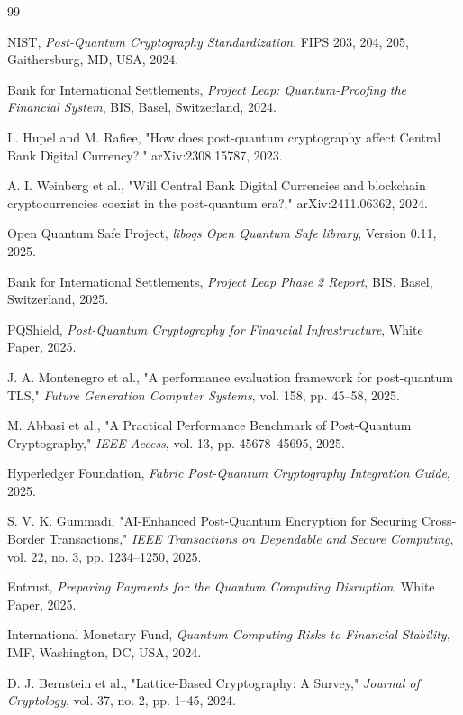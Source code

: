 \documentclass[pdflatex,sn-basic,english]{sn-jnl}
\begin{document}
\begin{thebibliography}{99}

NIST, \emph{Post-Quantum Cryptography Standardization}, FIPS 203, 204, 205, Gaithersburg, MD, USA, 2024.

Bank for International Settlements, \emph{Project Leap: Quantum-Proofing the Financial System}, BIS, Basel, Switzerland, 2024.

L. Hupel and M. Rafiee, "How does post-quantum cryptography affect Central Bank Digital Currency?," arXiv:2308.15787, 2023.

A. I. Weinberg et al., "Will Central Bank Digital Currencies and blockchain cryptocurrencies coexist in the post-quantum era?," arXiv:2411.06362, 2024.

Open Quantum Safe Project, \emph{liboqs Open Quantum Safe library}, Version 0.11, 2025.

Bank for International Settlements, \emph{Project Leap Phase 2 Report}, BIS, Basel, Switzerland, 2025.

PQShield, \emph{Post-Quantum Cryptography for Financial Infrastructure}, White Paper, 2025.

J. A. Montenegro et al., "A performance evaluation framework for post-quantum TLS," \emph{Future Generation Computer Systems}, vol. 158, pp. 45--58, 2025.

M. Abbasi et al., "A Practical Performance Benchmark of Post-Quantum Cryptography," \emph{IEEE Access}, vol. 13, pp. 45678--45695, 2025.

Hyperledger Foundation, \emph{Fabric Post-Quantum Cryptography Integration Guide}, 2025.

S. V. K. Gummadi, "AI-Enhanced Post-Quantum Encryption for Securing Cross-Border Transactions," \emph{IEEE Transactions on Dependable and Secure Computing}, vol. 22, no. 3, pp. 1234--1250, 2025.

Entrust, \emph{Preparing Payments for the Quantum Computing Disruption}, White Paper, 2025.

International Monetary Fund, \emph{Quantum Computing Risks to Financial Stability}, IMF, Washington, DC, USA, 2024.

D. J. Bernstein et al., "Lattice-Based Cryptography: A Survey," \emph{Journal of Cryptology}, vol. 37, no. 2, pp. 1--45, 2024.


\end{thebibliography}
\end{document}
